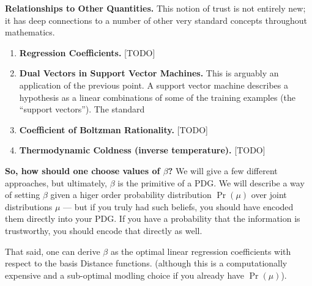 \documentclass[twoside]{article} %
\theoremstyle{plain}
\theoremstyle{definition}
\begin{document}
    \textbf{Relationships to Other Quantities.}
    This notion of trust is not entirely new; it has deep connections to a number of other very standard concepts throughout mathematics.

    \begin{enumerate}
        \item \textbf{Regression Coefficients.} [TODO]

        \item \textbf{Dual Vectors in Support Vector Machines.} This is arguably an application of the previous point. A support vector machine describes a hypothesis as a linear combinations of some of the training examples (the ``support vectors''). The standard

        \item \textbf{Coefficient of Boltzman Rationality.} [TODO]

        \item \textbf{Thermodynamic Coldness (inverse temperature).} [TODO]

    \end{enumerate}



    \textbf{So, how should one choose values of $\beta$?}
    We will give a few different approaches, but ultimately, $\beta$ is the primitive of a PDG.
    We will describe a way of setting $\beta$ given a higer order probability distribution $\Pr(\mu)$ over joint distributions $\mu$ --- but if you truly had such beliefs, you should have encoded them directly into your PDG.
    If you have a probability that the information is trustworthy, you should encode that directly as well.

    That said, one can derive $\beta$ as the optimal linear regression coefficients with respect to the basis Distance functions.
    (although this is a computationally expensive and a sub-optimal modling choice if you already have $\Pr(\mu)$).


\end{document}
